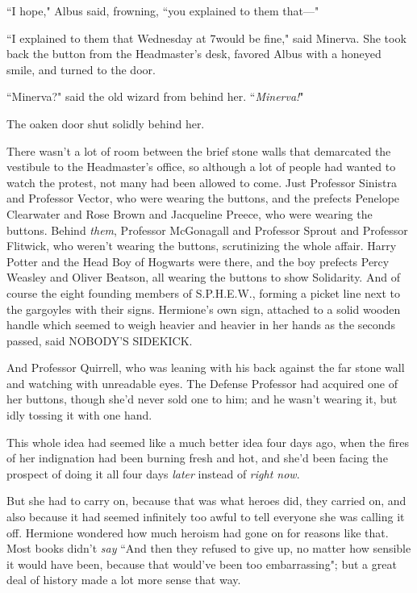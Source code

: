 ``I hope," Albus said, frowning, ``you explained to them that—"

``I explained to them that Wednesday at 7\pm would be fine," said Minerva. She took back the button from the Headmaster's desk, favored Albus with a honeyed smile, and turned to the door.

``Minerva?" said the old wizard from behind her. ``\emph{Minerva!}"

The oaken door shut solidly behind her.

\later

There wasn't a lot of room between the brief stone walls that demarcated the vestibule to the Headmaster's office, so although a lot of people had wanted to watch the protest, not many had been allowed to come. Just Professor Sinistra and Professor Vector, who were wearing the buttons, and the prefects Penelope Clearwater and Rose Brown and Jacqueline Preece, who were wearing the buttons. Behind \emph{them}, Professor McGonagall and Professor Sprout and Professor Flitwick, who weren't wearing the buttons, scrutinizing the whole affair. Harry Potter and the Head Boy of Hogwarts were there, and the boy prefects Percy Weasley and Oliver Beatson, all wearing the buttons to show Solidarity. And of course the eight founding members of S.P.H.E.W., forming a picket line next to the gargoyles with their signs. Hermione's own sign, attached to a solid wooden handle which seemed to weigh heavier and heavier in her hands as the seconds passed, said NOBODY'S SIDEKICK.

And Professor Quirrell, who was leaning with his back against the far stone wall and watching with unreadable eyes. The Defense Professor had acquired one of her buttons, though she'd never sold one to him; and he wasn't wearing it, but idly tossing it with one hand.

This whole idea had seemed like a much better idea four days ago, when the fires of her indignation had been burning fresh and hot, and she'd been facing the prospect of doing it all four days \emph{later} instead of \emph{right now}.

But she had to carry on, because that was what heroes did, they carried on, and also because it had seemed infinitely too awful to tell everyone she was calling it off. Hermione wondered how much heroism had gone on for reasons like that. Most books didn't \emph{say} ``And then they refused to give up, no matter how sensible it would have been, because that would've been too embarrassing"; but a great deal of history made a lot more sense that way.

